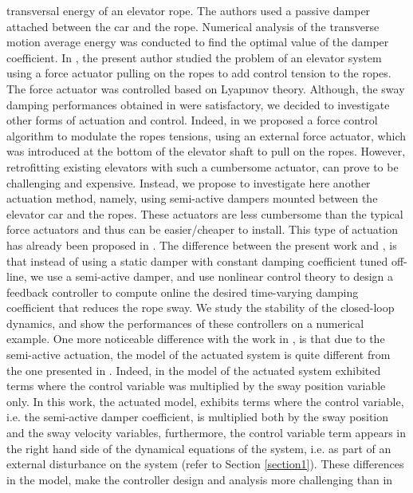 \documentclass[letterpaper, 11 pt, conference]{ieeeconf}
\begin{document}
 transversal energy of an elevator rope. The authors used a passive
 damper attached between the car and the rope. Numerical analysis
 of the transverse motion average energy was conducted to find the optimal
 value of the damper coefficient. In \cite{B14,B14_1,B14_2}, the present author studied the problem of an elevator system using a force actuator pulling on the ropes to add control tension to the ropes. The
 force actuator was controlled based on Lyapunov theory. Although, the sway damping performances obtained in \cite{B14,B14_1,B14_2} were satisfactory, we decided
 to investigate other forms of actuation and control. Indeed, in
 \cite{B14,B14_1,B14_2} we proposed a force control algorithm to modulate the
 ropes tensions, using an external force actuator, which was
 introduced at the bottom of the elevator shaft to pull on the
 ropes. However, retrofitting existing elevators with such a
 cumbersome actuator, can prove to be challenging and expensive.
 Instead, we propose to investigate here another actuation method,
 namely, using semi-active dampers mounted between the elevator
 car and the ropes. These actuators are less cumbersome than the
 typical force actuators and thus can be easier/cheaper to
 install.
This type of actuation has already been proposed in  \cite{ZC06}.
The difference between the present work and
 \cite{ZC06}, is that instead of using a static damper with constant damping coefficient tuned off-line, we use a
 semi-active damper, and use nonlinear control theory to design a
 feedback controller to compute online the desired time-varying damping
 coefficient that reduces the rope sway. We study the stability of the closed-loop dynamics, and show the
 performances of these controllers on a numerical example. One
 more noticeable difference with the work in \cite{B14}, is that
 due to the semi-active actuation, the model of the actuated system is
 quite different from the one presented in \cite{B14}. Indeed, in
 \cite{B14} the model of the actuated system exhibited terms where
 the control variable was multiplied by the sway position variable
 only. In this work, the actuated model, exhibits terms where the
 control variable, i.e. the semi-active damper coefficient, is
 multiplied both by the sway position and the sway velocity
 variables, furthermore, the control variable term appears in the right hand
 side of the dynamical equations of the system, i.e. as part of an
 external disturbance on the system (refer to Section
 \ref{section1}). These differences in the model, make the
 controller design and analysis more challenging than in
\end{document}
